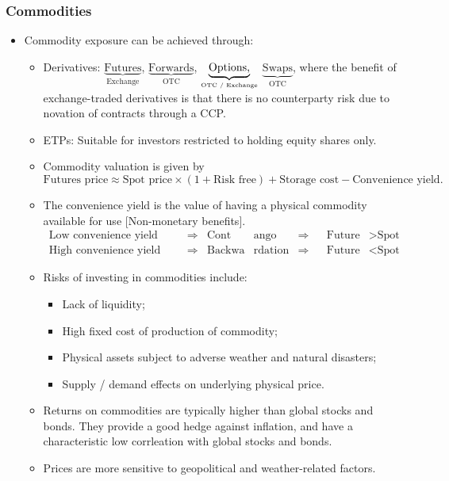 \documentclass[../notes_compiled.tex]{subfiles}
\begin{document}
\subsubsection{Commodities}
\begin{itemize}
\item Commodity exposure can be achieved through:
\begin{itemize}
\item Derivatives: $\underbrace{\text{Futures}}_{\text{Exchange}}$,  $\underbrace{\text{Forwards}}_{\text{OTC}}$, $\underbrace{\text{Options,}}_{\text{\tiny{OTC / Exchange}}}$ $\underbrace{\text{Swaps}}_{\text{OTC}}$, where the benefit of exchange-traded derivatives is that there is no counterparty risk due to novation of contracts through a CCP.
\item ETPs: Suitable for investors restricted to holding equity shares only.
\item Commodity valuation is given by
\small{
\begin{equation}
\text{Futures price} \approx \text{Spot price} \times (1 + \text{Risk free}) + \text{Storage cost} - \text{Convenience yield}.
\end{equation}
}
\item[]\normalsize{The convenience yield is the value of having a physical commodity available for use [Non-monetary benefits].}
\begin{align*}
\text{Low convenience yield}& & &\Longrightarrow &  \text{Cont}&\text{ango} & \Longrightarrow && \text{Future}&> \text{Spot} \\
\text{High convenience yield}& & &\Longrightarrow & \text{Backwa}&\text{rdation}& \Longrightarrow && \text{Future}&<\text{Spot}
\end{align*}
\item Risks of investing in commodities include:
\begin{itemize}
\item Lack of liquidity;
\item High fixed cost of production of commodity;
\item Physical assets subject to adverse weather and natural disasters;
\item Supply / demand effects on underlying physical price.
\end{itemize}

\item Returns on commodities are typically higher than global stocks and bonds. They provide a good hedge against inflation, and have a characteristic low corrleation with global stocks and bonds.
\item Prices are more sensitive to geopolitical and weather-related factors.
\end{itemize}
\end{itemize}
\end{document}
